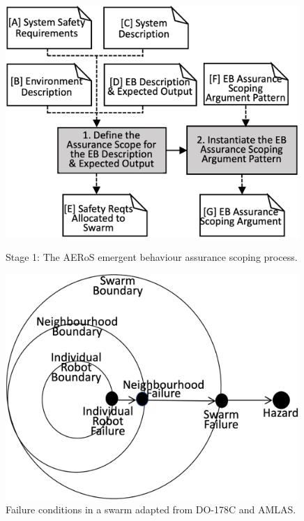 \documentclass[runningheads]{llncs}
\begin{document}
\begin{figure}[!t]
	\centering
	\begin{minipage}{.5\textwidth}
		\centering
		\includegraphics[width=0.99\textwidth]{figures/AERoS-Stage1.png}
		\vspace{-2ex}
		\caption{Stage 1: The AERoS emergent behaviour assurance scoping process.}
		\label{amlas-a-stage1}
	\end{minipage}%
	\hspace*{.03\textwidth}
	\begin{minipage}{.5\textwidth}
		\includegraphics[width=0.99\textwidth]{figures/stage1-failureevents-v3.png}
		\vspace{-2ex}
		\caption{Failure conditions in a swarm adapted from DO-178C and AMLAS.}
		\label{failure-events}
	\end{minipage}
	\vspace{-4ex}
\end{figure}
\end{document}
